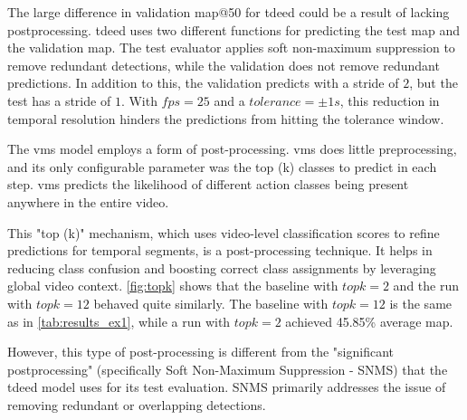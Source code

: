 The large difference in validation \acrshort{map}@50 for \acrshort{tdeed} could be a result of lacking postprocessing. \acrshort{tdeed} uses two different functions for predicting the test \acrshort{map} and the validation \acrshort{map}. The test evaluator applies soft non-maximum suppression to remove redundant detections, while the validation does not remove redundant predictions. In addition to this, the validation predicts with a stride of \(2\), but the test has a stride of \(1\). With \(fps=25\) and a \(tolerance = \pm 1s\), this reduction in temporal resolution hinders the predictions from hitting the tolerance window. 



The \acrshort{vms} model employs a form of post-processing. \acrshort{vms} does little preprocessing, and its only configurable parameter was the top (k) classes to predict in each step. \acrshort{vms} predicts the likelihood of different action classes being present anywhere in the entire video. 

This "top (k)" mechanism, which uses video-level classification scores to refine predictions for temporal segments, is a post-processing technique. It helps in reducing class confusion and boosting correct class assignments by leveraging global video context. \autoref{fig:topk} shows that the baseline with \(topk=2\) and the run with \(topk=12\) behaved quite similarly. The baseline with \(topk=12\) is the same as in \autoref{tab:results_ex1}, while a run with \(topk=2\) achieved 45.85\% average \acrshort{map}.

However, this type of post-processing is different from the "significant postprocessing" (specifically Soft Non-Maximum Suppression - SNMS) that the \acrshort{tdeed} model uses for its test evaluation. SNMS primarily addresses the issue of removing redundant or overlapping detections.

